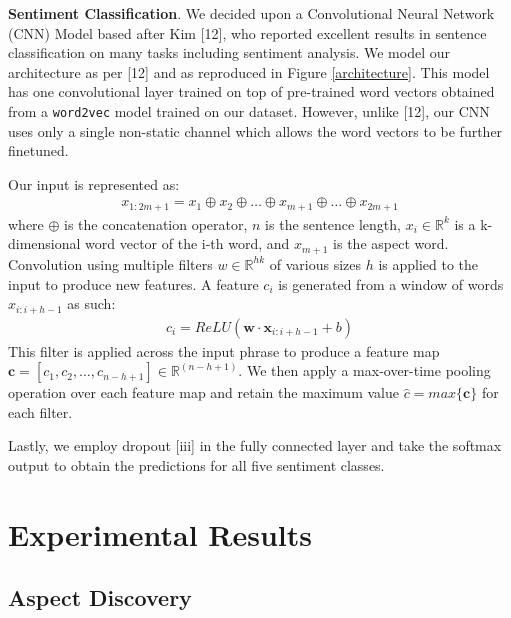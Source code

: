 \documentclass{article} %
\begin{document}
\textbf{Sentiment Classification}. We decided upon a Convolutional Neural Network (CNN) Model based after Kim [12], who reported excellent results in sentence classification on many tasks including sentiment analysis. We model our architecture as per [12] and as reproduced in Figure \ref{architecture}. This model has one convolutional layer trained on top of pre-trained word vectors obtained from a \texttt{word2vec} model trained on our dataset. However, unlike [12], our CNN uses only a single non-static channel which allows the word vectors to be further finetuned.

Our input is represented as:
\begin{align}
	x_{1:2m+1} = x_1 \oplus x_2 \oplus \ldots \oplus x_{m+1} \oplus \ldots \oplus x_{2m+1}
\end{align}
where $\oplus$ is the concatenation operator, $n$ is the sentence length, $x_i \in \mathbb{R}^k$ is a k-dimensional word vector of the i-th word, and $x_{m+1}$ is the aspect word. Convolution using multiple filters $w \in \mathbb{R}^{hk}$ of various sizes $h$ is applied to the input to produce new features. A feature $c_i$ is generated from a window of words $x_{i:i+h-1}$ as such:
\begin{align}
c_i = ReLU(\textbf{w} \cdot \textbf{x}_{i:i+h-1} + b)
\end{align}
This filter is applied across the input phrase to produce a feature map $\textbf{c} = [c_1, c_2, \ldots, c_{n-h+1}] \in \mathbb{R}^(n-h+1)$. We then apply a max-over-time pooling operation over each feature map and retain the maximum value $\hat{c} = max \{\textbf{c}\}$ for each filter.

Lastly, we employ dropout [iii] in the fully connected layer and take the softmax output to obtain the predictions for all five sentiment classes.


\section{Experimental Results} 

\subsection{Aspect Discovery} 
\end{document}
